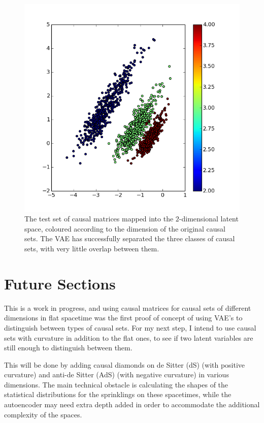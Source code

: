 \documentclass[letterpaper,10pt]{article}
\begin{document}
\begin{figure} [ht]
\begin{center}
  \includegraphics[width=5in]{latent_encoding.png}
\end{center}
  \caption{
The test set of causal matrices mapped into the $2$-dimensional latent space, coloured according to the dimension of the original causal sets.  
The VAE has successfully separated the three classes of causal sets, with very little overlap between them.} \label{resultsfig}
\end{figure}

\section{Future Sections} \label{future}

This is a work in progress, and using causal matrices for causal sets of different dimensions in flat spacetime was the first proof of concept of using 
VAE's to distinguish between types of causal sets.  For my next step, I intend to use causal sets with curvature in addition to the flat ones, to see if 
two latent variables are still enough to distinguish between them.  

This will be done by adding causal diamonds on de Sitter (dS) (with positive curvature) and anti-de Sitter (AdS) (with negative curvature) 
in various dimensions.  The main technical obstacle is calculating the 
shapes of the statistical distributions for the sprinklings on these spacetimes, while the autoencoder may need extra depth added in order to accommodate 
the additional complexity of the spaces.
\end{document}

